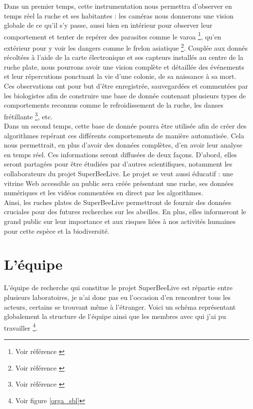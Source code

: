 \documentclass[11pt,french,a4paper]{report}
\begin{document}
Dans un premier temps, cette instrumentation nous permettra d'observer en temps réel la ruche et ses habitantes : 
les caméras nous donnerons une vision globale de ce qu'il s'y passe, aussi bien en intérieur pour observer leur 
comportement et tenter de repérer des parasites comme le varoa \footnote{Voir référence \cite{ref11}}, 
qu'en extérieur pour y voir les dangers comme le frelon asiatique \footnote{Voir référence \cite{ref12}}.
Couplée aux donnés récoltées à l'aide de la carte électronique et ses capteurs installés au centre de la ruche plate, 
nous pourrons avoir une vision complète et détaillée des événements et leur répercutions ponctuant la vie d'une colonie,
de sa naissance à sa mort. \\
Ces observations ont pour but d'être enregistrée, sauvegardées et commentées par les biologistes afin de construire une base
de donnée contenant plusieurs types de comportements reconnus comme le refroidissement de la ruche, les danses frétillante \footnote{Voir référence \cite{ref10}}, 
etc.  
\\
Dans un second temps, cette base de donnée pourra être utilisée afin de créer des algorithmes repérant ces différents comportements
de manière automatisée. Cela nous permettrait, en plus d'avoir des données complètes, d'en avoir leur analyse en 
temps réel. Ces informations seront diffusées de deux façons. D'abord, elles seront partagées pour être étudiées par d'autres scientifiques, 
notamment les collaborateurs du projet SuperBeeLive. Le projet se veut aussi éducatif : une vitrine Web accessible au public 
sera créée présentant une ruche, ses données numériques et les vidéos commentées en direct par les algorithmes. \\


Ainsi, les ruches plates de SuperBeeLive permettront de fournir des données cruciales pour des futures recherches sur les 
abeilles. En plus, elles informeront le grand public sur leur importance et aux risques liées à nos activités humaines pour 
cette espèce et la biodiversité. 


\section{L'équipe}
L'équipe de recherche qui constitue le projet SuperBeeLive est répartie entre plusieurs laboratoires, je n'ai donc pas eu l'occasion
d'en rencontrer tous les acteurs, certains se trouvant même à l'étranger. Voici un schéma représentant globalement la structure
de l'équipe ainsi que les membres avec qui j'ai pu travailler \footnote{ Voir figure \ref{orga_sbl} }. \\
\end{document}
